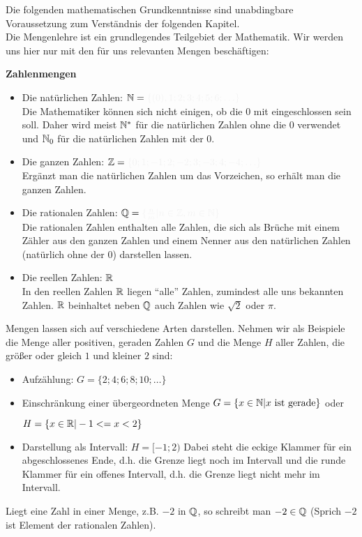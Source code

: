 Die folgenden mathematischen Grundkenntnisse sind unabdingbare Voraussetzung zum Verständnis der folgenden Kapitel.\\
Die Mengenlehre ist ein grundlegendes Teilgebiet der Mathematik. Wir werden uns hier nur mit den für uns relevanten Mengen beschäftigen:
\begin{tcolorbox}
	\textbf{Zahlenmengen}
	\begin{itemize}
		\item Die natürlichen Zahlen: \({\N=\textcolor{loestc}{\{(0), 1; 2; 3; 4; 5; 6; \ldots\}}}\)\\Die Mathematiker können sich nicht einigen, ob die 0 mit eingeschlossen sein soll. Daher wird meist $\mathbb{N}^*$ für die natürlichen Zahlen ohne die 0 verwendet und \(\mathbb{N}_0\) für die natürlichen Zahlen mit der 0.
		\item Die ganzen Zahlen: \({\Z=\textcolor{loestc}{\{0; 1; -1; 2; -2; 3; -3; 4; -4;\ldots\}}}\)\\Ergänzt man die natürlichen Zahlen um das Vorzeichen, so erhält man die ganzen Zahlen.
		\item Die rationalen Zahlen: \({\Q=\textcolor{loestc}{\{\frac{n}{m}|n\in\Z, m\in\N\}}}\)\\Die rationalen Zahlen enthalten alle Zahlen, die sich als Brüche mit einem Zähler aus den ganzen Zahlen und einem Nenner aus den natürlichen Zahlen (natürlich ohne der 0) darstellen lassen.
		\item Die reellen Zahlen: \(\mathbb{R}\)\\In den reellen Zahlen \(\mathbb{R}\) liegen "`alle"' Zahlen, zumindest alle uns bekannten Zahlen. \(\mathbb{R}\) beinhaltet neben \(\mathbb{Q}\) auch Zahlen wie \(\sqrt{2}\) oder \(\pi\).
	\end{itemize}
\end{tcolorbox}
Mengen lassen sich auf verschiedene Arten darstellen. Nehmen wir als Beispiele die Menge aller positiven, geraden Zahlen $G$ und die Menge $H$ aller Zahlen, die größer oder gleich $1$ und kleiner $2$ sind:
\begin{itemize}
	\item Aufzählung: ${G=\{2; 4; 6; 8; 10;\ldots \}}$
	\item Einschränkung einer übergeordneten Menge ${G=\{x\in\mathbb{N}|x\text{ ist gerade}\}}$ oder

	${H=\{x\in\mathbb{R}|-1<=x<2\}}$
	\item Darstellung als Intervall: $H=[-1;2)$ Dabei steht die eckige Klammer für ein abgeschlossenes Ende, d.h. die Grenze liegt noch im Intervall und die runde Klammer für ein offenes Intervall, d.h. die Grenze liegt nicht mehr im Intervall.
\end{itemize}
Liegt eine Zahl in einer Menge, z.B. $-2$ in $\mathbb{Q}$, so schreibt man ${-2\in\mathbb{Q}}$ (Sprich $-2$ ist Element der rationalen Zahlen).